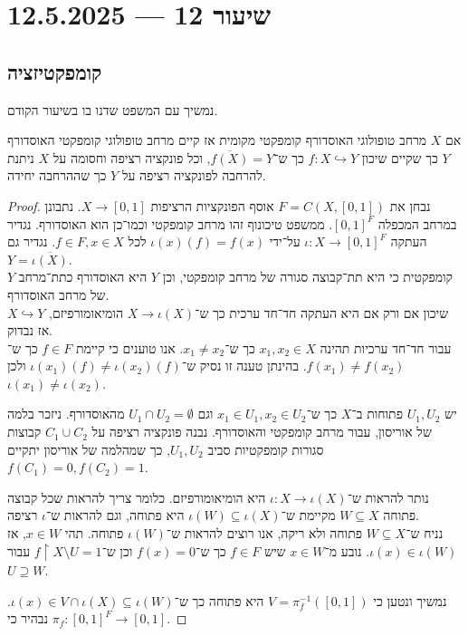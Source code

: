 \section{שיעור 12 --- 12.5.2025}
\subsection{קומפקטיזציה}
נמשיך עם המשפט שדנו בו בשיעור הקודם.
\begin{theorem}[סטון־צ'ק]
	אם $X$ מרחב טופולוגי האוסדורף קומפקטי מקומית אז קיים מרחב טופולוגי קומפקטי האוסדורף $Y$ כך שקיים שיכון $f : X \hookrightarrow Y$ כך ש־$\overline{f(X)} = Y$,
	וכל פונקציה רציפה וחסומה על $X$ ניתנת להרחבה לפונקציה רציפה על $Y$ כך שההרחבה יחידה.
\end{theorem}
\begin{proof}
	נבחן את $F = C(X, [0, 1])$ אוסף הפונקציות הרציפות $X \to [0, 1]$.
	נתבונן במרחב המכפלה ${[0, 1]}^F$.
	ממשפט טיכונוף זהו מרחב קומפקטי וכמו־כן הוא האוסדורף.
	נגדיר העתקה $\iota : X \to {[0, 1]}^F$ על־ידי $\iota(x)(f) = f(x)$ לכל $f \in F, x \in X$.
	נגדיר גם $Y = \overline{\iota(X)}$. \\
	$Y$ קומפקטית כי היא תת־קבוצה סגורה של מרחב קומפקטי, וכן $Y$ היא האוסדורף כתת־מרחב של מרחב האוסדורף. \\
	$X \hookrightarrow Y$ שיכון אם ורק אם היא העתקה חד־חד ערכית כך ש־$X \to \iota(X)$ הומיאומורפיזם, אז נבדוק. \\
	עבור חד־חד ערכיות תהינה $x_1, x_2 \in X$ כך ש־$x_1 \ne x_2$.
	אנו טוענים כי קיימת $f \in F$ כך ש־$f(x_1) \ne f(x_2)$.
	בהינתן טענה זו נסיק ש־$\iota(x_1)(f) \ne \iota(x_2)(f)$ ולכן $\iota(x_1) \ne \iota(x_2)$.

	יש $U_1, U_2$ פתוחות ב־$X$ כך ש־$x_1 \in U_1, x_2 \in U_2$ וגם $U_1 \cap U_2 = \emptyset$ מהאוסדורף.
	ניזכר בלמה של אוריסון, עבור מרחב קומפקטי והאוסדורף.
	נבנה פונקציה רציפה על $C_1 \cup C_2$ קבוצות סגורות קומפקטיות סביב $U_1, U_2$, כך שמהלמה של אוריסון יתקיים $f(C_1) = 0, f(C_2) = 1$.

	נותר להראות ש־$\iota : X \to \iota(X)$ היא הומיאומורפיזם.
	כלומר צריך להראות שכל קבוצה פתוחה $W \subseteq X$ מקיימת ש־$\iota(W) \subseteq \iota(X)$ היא פתוחה, וגם להראות ש־$\iota$ רציפה. \\
	נניח ש־$W \subseteq X$ פתוחה ולא ריקה, אנו רוצים להראות ש־$\iota(W)$ פתוחה.
	תהי $x \in W$, אז $\iota(x) \in \iota(W)$.
	נובע מ־$x \in W$ שיש $f \in F$ כך ש־$f(x) = 0$ וכן ש־$f \restriction X \setminus U = 1$ עבור $U \supseteq W$.

	נמשיך ונטען כי $V = \pi_f^{-1}([0, 1])$ היא פתוחה כך ש־$\iota(x) \in V \cap \iota(X) \subseteq \iota(W)$.
	נבהיר כי $\pi_f : {[0, 1]}^F \to [0, 1]$.


\end{proof}

